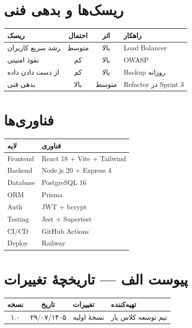 \documentclass[12pt, a4paper]{article}
\begin{document}
\section{ریسک‌ها و بدهی فنی}

\begin{center}
\begin{tabular}{|p{3cm}|c|c|p{4cm}|}
\hline
\textbf{ریسک} & \textbf{احتمال} & \textbf{اثر} & \textbf{راهکار} \\
\hline
رشد سریع کاربران & متوسط & بالا & Load Balancer \\
\hline
نفوذ امنیتی & کم & بالا & OWASP \\
\hline
از دست دادن داده & کم & بالا & Backup روزانه \\
\hline
بدهی فنی & بالا & متوسط & Refactor در Sprint 3 \\
\hline
\end{tabular}
\end{center}

\section{فناوری‌ها}

\begin{center}
\begin{tabular}{|l|p{7cm}|}
\hline
\textbf{لایه} & \textbf{فناوری} \\
\hline
Frontend & React 18 + Vite + Tailwind \\
\hline
Backend & Node.js 20 + Express 4 \\
\hline
Database & PostgreSQL 16 \\
\hline
ORM & Prisma \\
\hline
Auth & JWT + bcrypt \\
\hline
Testing & Jest + Supertest \\
\hline
CI/CD & GitHub Actions \\
\hline
Deploy & Railway \\
\hline
\end{tabular}
\end{center}

\clearpage
{}
{}
\section*{پیوست الف — تاریخچهٔ تغییرات}

\vspace{0.5cm}

\begin{center}
\begin{tabular}{|c|c|p{5cm}|p{3cm}|}
\hline
\textbf{نسخه} & \textbf{تاریخ} & \textbf{تغییرات} & \textbf{تهیه‌کننده} \\
\hline
۱.۰ & ۲۹/۰۷/۱۴۰۵ & نسخهٔ اولیه & تیم توسعه کلاس یار \\
\hline
\end{tabular}
\end{center}
\end{document}

